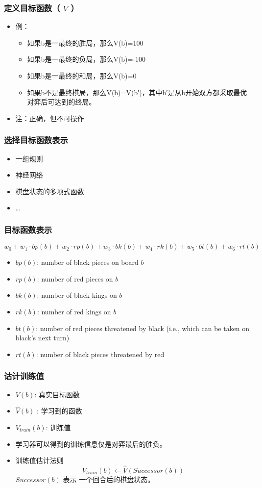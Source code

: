 \documentclass{beamer}
\begin{document}
\begin{frame}
\frametitle{定义目标函数（ $V$ ）}
\label{sec-4-4}

\begin{itemize}
\item 例：
\begin{itemize}
\item 如果b是一最终的胜局，那么V(b)=100
\item 如果b是一最终的负局，那么V(b)=-100
\item 如果b是一最终的和局，那么V(b)=0
\item 如果b不是最终棋局，那么V(b)=V(b′)，其中b′是从b开始双方都采取最优对弈后可达到的终局。
\end{itemize}
\item 注：正确，但不可操作
\end{itemize}
\end{frame}
\begin{frame}
\frametitle{选择目标函数表示}
\label{sec-4-5}


\begin{itemize}
\item 一组规则
\item 神经网络
\item 棋盘状态的多项式函数
\item \ldots{}
\end{itemize}
\end{frame}
\begin{frame}
\frametitle{目标函数表示}
\label{sec-4-6}

\[ w_{0} + w_{1}\cdot bp(b) + w_{2}\cdot rp(b) + w_{3}\cdot bk(b) + w_{4}\cdot rk(b) + w_{5}\cdot bt(b) + w_{6}\cdot rt(b) \]

\begin{itemize}
\item $bp(b)$: number of black pieces on board $b$
\item $rp(b)$: number of red pieces on $b$
\item $bk(b)$: number of black kings on $b$
\item $rk(b)$: number of red kings on $b$
\item $bt(b)$: number of red pieces threatened by black (i.e., which can be taken
         on black's next turn)
\item $rt(b)$:  number of black pieces threatened by red
\end{itemize}
\end{frame}
\begin{frame}
\frametitle{诂计训练值}
\label{sec-4-7}


\begin{itemize}
\item $V(b)$: 真实目标函数
\item $\hat{V}(b)$ : 学习到的函数
\item $V_{train}(b)$: 训练值
\item 学习器可以得到的训练信息仅是对弈最后的胜负。
\item 训练值估计法则 
   $$V_{train}(b) \leftarrow \hat{V}(Successor(b))$$
   $Successor(b)$ 表示 一个回合后的棋盘状态。
\end{itemize}
\end{frame}
\end{document}

